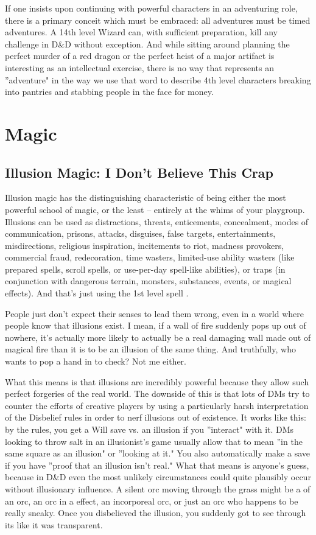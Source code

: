If one insists upon continuing with powerful characters in an adventuring role, there is a primary conceit which must be embraced: all adventures must be timed adventures. A 14th level Wizard can, with sufficient preparation, kill any challenge in D\&D without exception. And while sitting around planning the perfect murder of a red dragon or the perfect heist of a major artifact is interesting as an intellectual exercise, there is no way that represents an ''adventure" in the way we use that word to describe 4th level characters breaking into pantries and stabbing people in the face for money.


\section{Magic}

\subsection{Illusion Magic: I Don't Believe This Crap}

Illusion magic has the distinguishing characteristic of being either the most powerful school of magic, or the least -- entirely at the whims of your playgroup. Illusions can be used as distractions, threats, enticements, concealment, modes of communication, prisons, attacks, disguises, false targets, entertainments, misdirections, religious inspiration, incitements to riot, madness provokers, commercial fraud, redecoration, time wasters, limited-use ability wasters (like prepared spells, scroll spells, or use-per-day spell-like abilities), or traps (in conjunction with dangerous terrain, monsters, substances, events, or magical effects). And that's just using the 1st level spell .

People just don't expect their senses to lead them wrong, even in a world where people know that illusions exist. I mean, if a wall of fire suddenly pops up out of nowhere, it's actually more likely to actually be a real damaging wall made out of magical fire than it is to be an illusion of the same thing. And truthfully, who wants to pop a hand in to check? Not me either.

What this means is that illusions are incredibly powerful because they allow such perfect forgeries of the real world. The downside of this is that lots of DMs try to counter the efforts of creative players by using a particularly harsh interpretation of the Disbelief rules in order to nerf illusions out of existence. It works like this: by the rules, you get a Will save vs. an illusion if you ''interact" with it. DMs looking to throw salt in an illusionist's game usually allow that to mean ''in the same square as an illusion" or ''looking at it." You also automatically make a save if you have ''proof that an illusion isn't real." What that means is anyone's guess, because in D\&D even the most unlikely circumstances could quite plausibly occur without illusionary influence. A silent orc moving through the grass might be a  of an orc, an orc in a  effect, an incorporeal orc, or just an orc who happens to be really sneaky. Once you disbelieved the illusion, you suddenly got to see through its like it was transparent.

